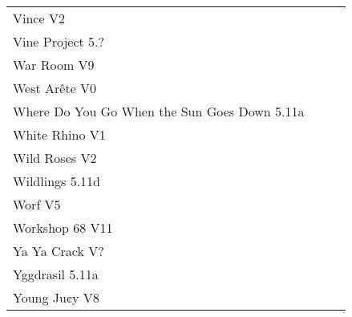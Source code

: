 \begin{flushleft}
\begin{center}
\begin{supertabular}{p{0.76\linewidth}p{0.08\linewidth}}
Vince V2 & \pageref{rt:Vince} \\
Vine Project 5.? & \pageref{rt:Vine Project} \\
War Room V9 & \pageref{rt:War Room} \\
West Arête V0 & \pageref{rt:West Arête} \\
Where Do You Go When the Sun Goes Down 5.11a & \pageref{rt:Where Do You Go When the Sun Goes Down} \\
White Rhino V1 & \pageref{rt:White Rhino} \\
Wild Roses V2 & \pageref{rt:Wild Roses} \\
Wildlings 5.11d & \pageref{rt:Wildlings} \\
Worf V5 & \pageref{rt:Worf} \\
Workshop 68 V11 & \pageref{vr:Workshop 68} \\
Ya Ya Crack V? & \pageref{rt:Ya Ya Crack} \\
Yggdrasil 5.11a & \pageref{rt:Yggdrasil} \\
Young Ju¢y V8 & \pageref{rt:Young Ju¢y} \\
\end{supertabular}
\end{center}
\needspace{1.5cm}

\end{flushleft}
